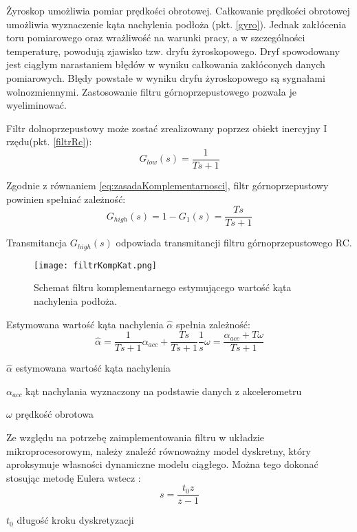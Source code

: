 Żyroskop umożliwia pomiar prędkości obrotowej. Całkowanie prędkości obrotowej umożliwia wyznaczenie kąta nachylenia podłoża (pkt. \ref{gyro}). Jednak zakłócenia toru pomiarowego oraz wrażliwość na warunki pracy, a w szczególności temperaturę, powodują zjawisko tzw. dryfu żyroskopowego. Dryf spowodowany jest ciągłym narastaniem błędów w wyniku całkowania zakłóconych danych pomiarowych. Błędy powstałe w wyniku dryfu żyroskopowego są sygnałami wolnozmiennymi. Zastosowanie filtru górnoprzepustowego pozwala je wyeliminować. 

Filtr dolnoprzepustowy może zostać zrealizowany poprzez obiekt inercyjny I rzędu(pkt. \ref{filtrRc}):
\begin{equation}
    G_{low}(s)=\frac{1}{Ts+1}
    \label{eq:lowPass}
\end{equation}

Zgodnie z równaniem \ref{eq:zasadaKomplementarnosci}, filtr górnoprzepustowy powinien spełniać zależność:
\begin{equation}
    G_{high}(s)=1-G_{1}(s)=\frac{Ts}{Ts+1}
    \label{eq:highPass}
\end{equation}

Transmitancja $G_{high}(s)$ odpowiada transmitancji filtru górnoprzepustowego RC.

\begin{figure}[h]
    \centering
    \texttt{[image: filtrKompKat.png]}
    \caption{Schemat filtru komplementarnego estymującego wartość kąta nachylenia podłoża.}
    \label{fig:kompKat}
\end{figure}

Estymowana wartość kąta nachylenia $\hat{\alpha}$ spełnia zależność:
\begin{equation}
    \hat{\alpha} = \frac{1}{Ts+1}\alpha_{acc}+\frac{Ts}{Ts+1}\frac{1}{s}\omega = \frac{\alpha_{acc}+T\omega}{Ts + 1}
    \label{eq:alpha}
\end{equation}
\begin{eqwhere}[2cm]
	\item[$\hat{\alpha}$] estymowana wartość kąta nachylenia
	\item[$\alpha_{acc}$] kąt nachylania wyznaczony na podstawie danych z akcelerometru
	\item[$\omega$] prędkość obrotowa
\end{eqwhere}

Ze względu na potrzebę zaimplementowania filtru w układzie mikroprocesorowym, należy znaleźć równoważny model dyskretny, który aproksymuje własności dynamiczne modelu ciągłego. Można tego dokonać stosując metodę Eulera wstecz \cite{grega}:
\begin{equation}
    s=\frac{t_0z}{z-1}
    \label{eq:eulerWstecz}
\end{equation}
\begin{eqwhere}[2cm]
	\item[$t_{0}$] długość kroku dyskretyzacji
\end{eqwhere}

